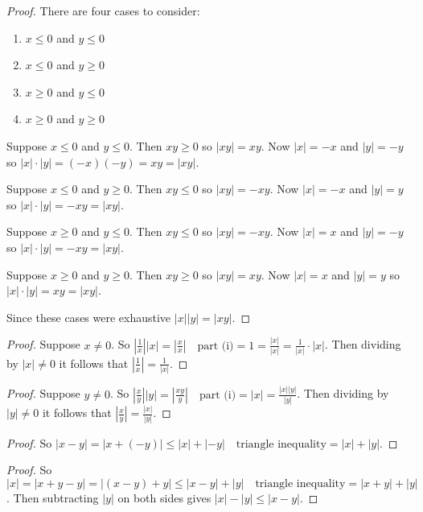\begin{proof}
    There are four cases to consider:
        \begin{enumerate}
            \item $x \le 0$ and $y \le 0$
            \item $x \le 0$ and $y \ge 0$
            \item $x \ge 0$ and $y \le 0$
            \item $x \ge 0$ and $y \ge 0$
        \end{enumerate}
    Suppose $x \le 0$ and $y \le 0$. Then $xy \ge 0$ so $|xy| = xy$.
    Now $|x| = -x$ and $|y| = -y$ so $|x| \cdot |y| = (-x)(-y) = xy = |xy|$.

    Suppose $x \le 0$ and $y \ge 0$. Then $xy \le 0$ so $|xy| = -xy$.
    Now $|x| = -x$ and $|y| = y$ so $|x| \cdot |y| = -xy = |xy|$.

    Suppose $x \ge 0$ and $y \le 0$. Then $xy \le 0$ so $|xy| = -xy$.
    Now $|x| = x$ and $|y| = -y$ so $|x| \cdot |y| = -xy = |xy|$.

    Suppose $x \ge 0$ and $y \ge 0$. Then $xy \ge 0$ so $|xy| = xy$.
    Now $|x| = x$ and $|y| = y$ so $|x| \cdot |y| = xy = |xy|$.

    Since these cases were exhaustive $|x||y| = |xy|$.
\end{proof}

\begin{proof}
    Suppose $x \not = 0$.
    So $|\frac{1}{x}||x| = |\frac{x}{x}| \quad \text{part (i)} = 1 = \frac{|x|}{|x|} = \frac{1}{|x|} \cdot |x|$.
    Then dividing by $|x| \not = 0$ it follows that $|\frac{1}{x}| = \frac{1}{|x|}$.
\end{proof}

\begin{proof}
    Suppose $y \not = 0$.
    So $|\frac{x}{y}||y| = |\frac{xy}{y}| \quad \text{part (i)} = |x| = \frac{|x||y|}{|y|}$.
    Then dividing by $|y| \not = 0$ it follows that $|\frac{x}{y}| = \frac{|x|}{|y|}$.
\end{proof}

\begin{proof}
    So $|x - y| = |x + (-y)| \le |x| + |-y| \quad \text{triangle inequality} = |x| + |y|$.
\end{proof}

\begin{proof}
    So $|x| = |x + y - y| = |(x - y) + y| \le |x - y| + |y| \quad \text{triangle inequality} = |x + y| + |y|$.
    Then subtracting $|y|$ on both sides gives $|x| - |y| \le |x - y|$.
\end{proof}

